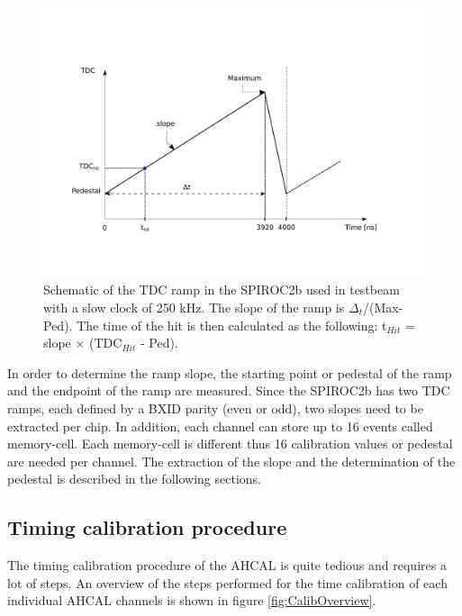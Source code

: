 \begin{figure}[htbp!]
  \centering
  \includegraphics[width=0.9\linewidth]{fig/TDCRamp.pdf}
  \caption{Schematic of the TDC ramp in the SPIROC2b used in testbeam with a slow clock of 250 kHz. The slope of the ramp is $\Delta_t$/(Max-Ped). The time of the hit is then calculated as the following: t$_{Hit}$ = slope $\times$ (TDC$_{Hit}$ - Ped).} \label{fig:ConvertTime}
\end{figure}

In order to determine the ramp slope, the starting point or pedestal of the ramp and the endpoint of the ramp are measured. Since the SPIROC2b has two TDC ramps, each defined by a BXID parity (even or odd), two slopes need to be extracted per chip. In addition, each channel can store up to 16 events called memory-cell. Each memory-cell is different thus 16 calibration values or pedestal are needed per channel. The extraction of the slope and the determination of the pedestal is described in the following sections.

\subsection{Timing calibration procedure}

The timing calibration procedure of the AHCAL is quite tedious and requires a lot of steps. An overview of the steps performed for the time calibration of each individual AHCAL channels is shown in figure \ref{fig:CalibOverview}.

